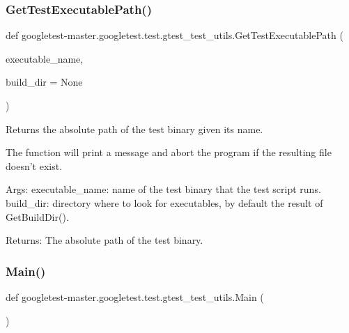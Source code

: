 \mbox{\label{namespacegoogletest-master_1_1googletest_1_1test_1_1gtest__test__utils_a78bbc69ac699e750a6a29188caa643c4}} 
\subsubsection{\texorpdfstring{GetTestExecutablePath()}{GetTestExecutablePath()}}
{\footnotesize\ttfamily def googletest-\/master.\+googletest.\+test.\+gtest\+\_\+test\+\_\+utils.\+Get\+Test\+Executable\+Path (\begin{DoxyParamCaption}\item[{}]{executable\+\_\+name,  }\item[{}]{build\+\_\+dir = {\ttfamily None} }\end{DoxyParamCaption})}

\begin{DoxyVerb}Returns the absolute path of the test binary given its name.

The function will print a message and abort the program if the resulting file
doesn't exist.

Args:
  executable_name: name of the test binary that the test script runs.
  build_dir:       directory where to look for executables, by default
                   the result of GetBuildDir().

Returns:
  The absolute path of the test binary.
\end{DoxyVerb}
 \mbox{\label{namespacegoogletest-master_1_1googletest_1_1test_1_1gtest__test__utils_a09393458111e351256e56556175f31be}} 
\subsubsection{\texorpdfstring{Main()}{Main()}}
{\footnotesize\ttfamily def googletest-\/master.\+googletest.\+test.\+gtest\+\_\+test\+\_\+utils.\+Main (\begin{DoxyParamCaption}{ }\end{DoxyParamCaption})}

